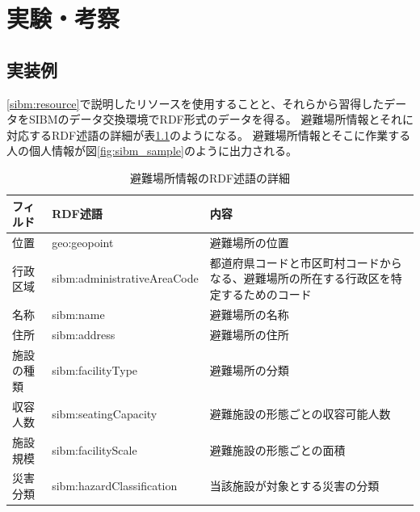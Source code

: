 ﻿%
\chapter{実験・考察}

\section{実装例}

\ref{sibm:resource}で説明したリソースを使用することと、それらから習得したデータをSIBMのデータ交換環境でRDF形式のデータを得る。
避難場所情報とそれに対応するRDF述語の詳細が表\ref{table:data_rdf_predicate}のようになる。
避難場所情報とそこに作業する人の個人情報が図\ref{fig:sibm_sample}のように出力される。

\begin{table}[h]
	\begin{center}
	\begin{tabular}{| l | l | p{48mm} |}
		\hline
		\rowstyle{\bfseries}
		フィルド & RDF述語 & 内容 \\
		\hline
		位置 & geo:geopoint & 避難場所の位置 \\
		\hline
		行政区域 & sibm:administrativeAreaCode &
		都道府県コードと市区町村コードからなる、避難場所の所在する行政区を特定するためのコード \\
		\hline
		名称 & sibm:name & 避難場所の名称 \\
		\hline
		住所 & sibm:address & 避難場所の住所 \\
		\hline
		施設の種類 & sibm:facilityType & 避難場所の分類 \\
		\hline
		収容人数 & sibm:seatingCapacity & 避難施設の形態ごとの収容可能人数 \\
		\hline
		施設規模 & sibm:facilityScale & 避難施設の形態ごとの面積 \\
		\hline
		災害分類 & sibm:hazardClassification & 当該施設が対象とする災害の分類 \\
		\hline
	\end{tabular}
	\caption{避難場所情報のRDF述語の詳細}
	\label{table:data_rdf_predicate}
	\end{center}
\end{table}
	
